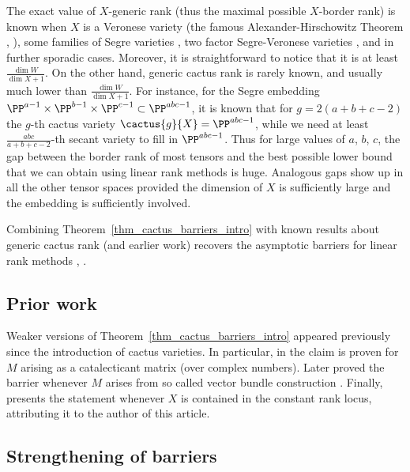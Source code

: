 \documentclass[12pt,a4paper]{article}
\begin{document}
The exact value of $X$-generic rank (thus the maximal possible $X$-border rank) is known when $X$ is a Veronese variety (the famous Alexander-Hirschowitz Theorem \cite{alexander_hirschowitz_polynomial_interpolation}, \cite{brambilla_ottaviani_on_AH_theorem}), some families of Segre varieties \cite{abo_ottaviani_peterson_segre}, two factor Segre-Veronese varieties \cite{abo_brambilla_galuppi_oneto_nondef_of_Segre_Veronese}, \cite{dolezalek_ken_secant_vars_Segre_Veronese_O_1_2_nondef} and in further sporadic cases.
Moreover, it is straightforward to notice
that it is at least $\frac{\dim W}{\dim X+1}$.
On the other hand, generic cactus rank is rarely known, and usually much lower than $\frac{\dim W}{\dim X+1}$.
For instance, for the Segre embedding
$\PP^{a-1}\times\PP^{b-1}\times \PP^{c-1}\subset\PP^{abc-1}$,
it is known that for $g=2(a+b+c-2)$ the $g$-th cactus variety $\cactus{g}{X} = \PP^{abc-1}$, while we need at least $\frac{abc}{a+b+c-2}$-th secant variety to fill in $\PP^{abc-1}$.
Thus for large values of $a$, $b$, $c$, the gap between the border rank of most tensors and the best possible lower bound that we can obtain using linear rank methods is huge.
Analogous gaps show up in all the other tensor spaces provided the dimension of $X$ is sufficiently large and the embedding is sufficiently involved.

Combining Theorem~\ref{thm_cactus_barriers_intro}
with known results about generic cactus rank \cite[Cor.~1.7]{galazka_mgr_publ} (and earlier work)
recovers the asymptotic barriers for linear rank methods \cite[Thms~1 and 2]{efremenko_garg_oliveira_wigderson_barriers_for_rank_methods}, \cite[Thm.~8.4, Cor.~8.5]{garg_makam_oliveira_wigderson_more_barriers_for_rank_methods}.


\subsection{Prior work}
Weaker versions
of Theorem~\ref{thm_cactus_barriers_intro}
appeared previously since the introduction of cactus varieties.
In particular, in \cite[Prop.~3.6]{nisiabu_jabu_cactus}
the claim is proven for $M$ arising
as a catalecticant matrix (over complex numbers).
Later \cite[Thm~5]{galazka_vb_cactus} proved the barrier whenever $M$ arises
from so called vector bundle construction \cite[Constr.~2]{galazka_vb_cactus}.
Finally,
\cite[Thm~1.18]{galazka_phd} presents the statement whenever $X$ is contained in the constant rank locus,
attributing it to the author of this article.

\subsection{Strengthening of barriers}
\end{document}
